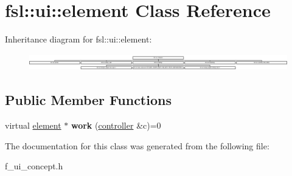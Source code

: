 \hypertarget{classfsl_1_1ui_1_1element}{}\section{fsl\+::ui\+::element Class Reference}
\label{classfsl_1_1ui_1_1element}
Inheritance diagram for fsl\+::ui\+::element\+:\begin{figure}[H]
\begin{center}
\leavevmode
\includegraphics[height=0.727273cm]{classfsl_1_1ui_1_1element}
\end{center}
\end{figure}
\subsection*{Public Member Functions}
\begin{DoxyCompactItemize}
\item 
\mbox{\label{classfsl_1_1ui_1_1element_a589c62c5da6332e6b457fb1ff168571f}} 
virtual \mbox{\hyperlink{classfsl_1_1ui_1_1element}{element}} $\ast$ {\bfseries work} (\mbox{\hyperlink{classfsl_1_1ui_1_1controller}{controller}} \&c)=0
\end{DoxyCompactItemize}


The documentation for this class was generated from the following file\+:\begin{DoxyCompactItemize}
\item 
f\+\_\+ui\+\_\+concept.\+h\end{DoxyCompactItemize}
